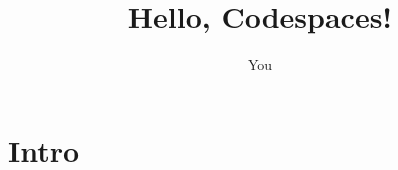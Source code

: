 \documentclass{article}
\title{Hello, Codespaces!}
\author{You}
\begin{document}
\maketitle
\section{Intro}
\lipsum[1-2]
\end{document}
